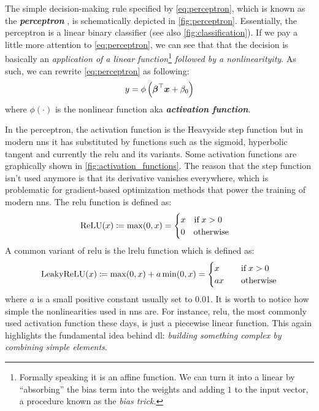 The simple decision-making rule specified by \Equation{} \ref{eq:perceptron}, which
is known as the \emph{\textbf{perceptron}}
\parencite{Rosenblatt1957}, is schematically depicted in \Figure{}
\ref{fig:perceptron}. Essentially, the perceptron is a linear binary
classifier (see also
\Figure{} \ref{fig:classification}). If we pay a little more attention to \Equation{}
\ref{eq:perceptron}, we can see that that the decision is basically an
\emph{application of a linear function}\footnote{Formally
speaking it is an affine function. We can turn it into a linear
by ``absorbing'' the bias term into the weights and adding $1$ to the input
vector, a procedure known as the \emph{bias trick}.}
\emph{followed by a nonlinearityity}. As such, we can rewrite
\Equation{} \ref{eq:perceptron} as following:
\begin{equation}
	\label{eq:neuron}
	y = \phi\left(\boldsymbol{\beta}^\top \boldsymbol{x} + \beta_0\right)
\end{equation}
where $\phi(\cdot)$ is the nonlinear function aka \emph{\textbf{activation
function}}.

In the perceptron, the activation function is the Heavyside step
function but in modern \glspl{nn} it has
substituted by functions such as the sigmoid, hyperbolic
tangent and currently the \gls{relu}
and its variants. Some activation functions are graphically shown in \Figure{}
\ref{fig:activation_functions}. The reason that the step function isn't used
anymore is that its derivative vanishes everywhere, which is
problematic for gradient-based optimization methods  that power the training of modern \glspl{nn}. The \gls{relu}
function is defined as:
\begin{equation}
	\operatorname*{ReLU}(x) \coloneqq
	\max(0, x) =
	\begin{cases}
		x \quad \text{if}\; x > 0 \\
		0 \quad \text{otherwise}
	\end{cases}
\end{equation}
A common variant of \gls{relu} is the \gls{lrelu}
function which is defined as:
\begin{align}
	\operatorname*{LeakyReLU}(x) \coloneqq
	\max(0, x) + a\min(0, x)=
	\begin{cases}
		x \quad & \text{if}\; x > 0 \\
		ax \quad & \text{otherwise} \\
	\end{cases}
\end{align}
where $a$ is a small positive constant usually set to \num{0.01}. It is worth to
notice how simple the nonlinearities used in \glspl{nn} are. For instance,
\gls{relu}, the most commonly used activation function these days, is just a
piecewise linear function. This again
highlights the fundamental idea behind \gls{dl}: \emph{building something
complex by combining simple elements}.

